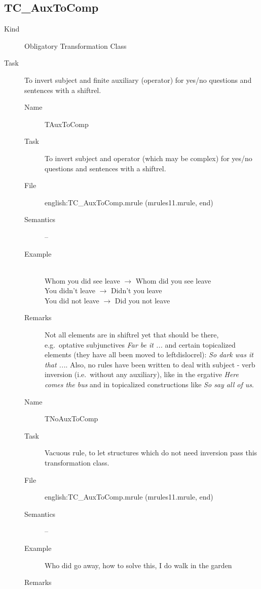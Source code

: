 \newpage
\subsection{TC\_AuxToComp}
\begin{description}
\item[Kind] Obligatory Transformation Class
\item[Task] To invert subject and finite auxiliary (operator) for yes/no 
questions and sentences with a shiftrel.

\vspace{1 cm}
\begin{description}
\item[Name] TAuxToComp
\item[Task] To invert subject and operator (which may be complex) for 
yes/no questions and sentences with a shiftrel.
\item[File] english:TC\_AuxToComp.mrule (mrules11.mrule, end)
\item[Semantics] --
\item[Example] \mbox{}\\
Whom you did see leave $\rightarrow$ Whom did you see leave \\
You didn't leave $\rightarrow$ Didn't you leave \\
You did not leave $\rightarrow$ Did you not leave
\item[Remarks] Not all elements are in shiftrel 
yet that should be there, e.g.\ optative subjunctives {\em Far be it ...\/} and 
certain topicalized elements (they have all been moved to leftdislocrel): {\em 
So dark was it that ...\/}. Also, no rules have been written to deal with 
subject - verb inversion (i.e.\ without any auxiliary), like in the ergative 
{\em Here comes the bus\/} and in topicalized constructions like {\em So say 
all of us\/}.
\end{description}

\vspace{1 cm}
\begin{description}
\item[Name] TNoAuxToComp
\item[Task] Vacuous rule, to let structures which do not need inversion pass 
this transformation class.
\item[File] english:TC\_AuxToComp.mrule (mrules11.mrule, end)
\item[Semantics] --
\item[Example] Who did go away, how to solve this, I do walk in the garden
\item[Remarks]
\end{description}

\end{description}

